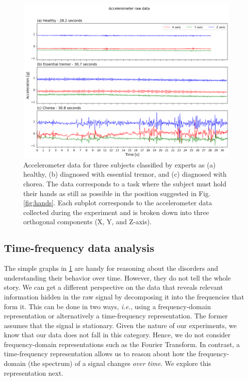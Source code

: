 \begin{figure}[ht]
\centering
\includegraphics[width=\linewidth]{figures/nemo/acc2.png}
\caption{Accelerometer data for three subjects classified by experts as (a) healthy, (b) diagnosed with essential tremor, and (c) diagnosed with chorea. The data corresponds to a task where the subject must hold their hands as still as possible in the position suggested in Fig. \ref{fig:hands}.
Each subplot corresponds to the accelerometer data collected during the experiment and is broken down into three orthogonal components (X, Y, and Z-axis). 
}
\label{fig:acc}
\end{figure}

\subsection{Time-frequency data analysis}
%
The simple graphs in \cref{fig:acc} are handy for reasoning about the disorders and understanding their behavior over time. However, they do not tell the whole story. We can get a different perspective on the data that reveals relevant information hidden in the raw signal by decomposing it into the frequencies that form it. This can be done in two ways, \emph{i.e.}, using a frequency-domain representation or alternatively a time-frequency representation. The former assumes that the signal is stationary. Given the nature of our experiments, we know that our data does not fall in this category. Hence, we do not consider frequency-domain representations such as the Fourier Transform. In contrast, a time-frequency representation allows us to reason about how the frequency-domain (the spectrum) of a signal changes \emph{over time}. We explore this representation next.

